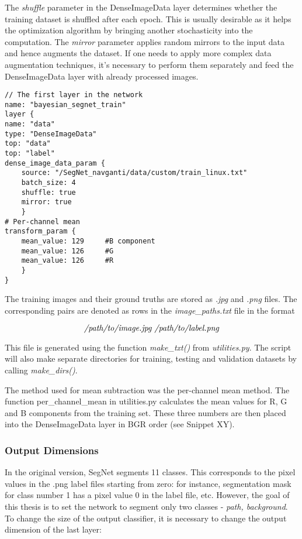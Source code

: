 The \textit{shuffle} parameter in the DenseImageData layer determines whether the training dataset is shuffled after each epoch. This is usually desirable as it helps the optimization algorithm by bringing another stochasticity into the computation. The \textit{mirror} parameter applies random mirrors to the input data and hence augments the dataset. If one needs to apply more complex data augmentation techniques, it's necessary to perform them separately and feed the DenseImageData layer with already processed images.

\begin{lstlisting}
// The first layer in the network
name: "bayesian_segnet_train"
layer {
name: "data"
type: "DenseImageData"
top: "data"
top: "label"
dense_image_data_param {
	source: "/SegNet_navganti/data/custom/train_linux.txt"
	batch_size: 4   			    			
	shuffle: true
	mirror: true	
	}
# Per-channel mean
transform_param {
	mean_value: 129		#B component
	mean_value: 126		#G
	mean_value: 126		#R
	}
}
\end{lstlisting} 

The training images and their ground truths are stored as \textit{.jpg} and \textit{.png} files. The corresponding pairs are denoted as rows in the \textit{image\_paths.txt} file in the format 

$$
\text{\textit{/path/to/image.jpg /path/to/label.png}}
$$

This file is generated using the function \textit{make\_txt()} from \textit{utilities.py}. The script will also make separate directories for training, testing and validation datasets by calling \textit{make\_dirs()}.

The method used for mean subtraction was the per-channel mean method. The function per\_channel\_mean in utilities.py calculates the mean values for R, G and B components from the training set. These three numbers are then placed into the DenseImageData layer in BGR order (see Snippet XY).

\subsubsection{Output Dimensions}

In the original version, SegNet segments 11 classes. This corresponds to the pixel values in the .png label files starting from zero: for instance, segmentation mask for class number 1 has a pixel value 0 in the label file, etc. However, the goal of this thesis is to set the network to segment only two classes - \textit{path, background}. To change the size of the output classifier, it is necessary to change the output dimension of the last layer:


